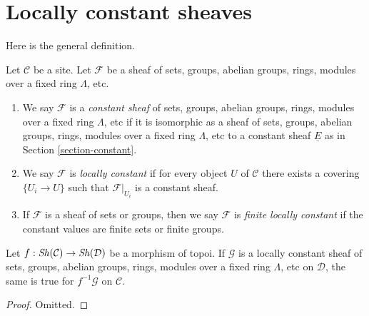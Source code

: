 \section{Locally constant sheaves}
\label{section-locally-constant}

\noindent
Here is the general definition.

\begin{definition}
\label{definition-locally-constant}
Let $\mathcal{C}$ be a site. Let $\mathcal{F}$ be a sheaf of sets, groups,
abelian groups, rings, modules over a fixed ring $\Lambda$, etc.
\begin{enumerate}
\item We say $\mathcal{F}$ is a
{\it constant sheaf} of
sets, groups, abelian groups, rings, modules over a fixed ring $\Lambda$, etc
if it is isomorphic as a sheaf of
sets, groups, abelian groups, rings, modules over a fixed ring $\Lambda$, etc
to a constant sheaf $\underline{E}$ as in Section \ref{section-constant}.
\item We say $\mathcal{F}$ is {\it locally constant} if for every object
$U$ of $\mathcal{C}$ there exists a
covering $\{U_i \to U\}$ such that $\mathcal{F}|_{U_i}$ is a constant sheaf.
\item If $\mathcal{F}$ is a sheaf of sets or groups, then we say $\mathcal{F}$
is {\it finite locally constant} if the constant values are finite sets or
finite groups.
\end{enumerate}
\end{definition}

\begin{lemma}
\label{lemma-pullback-locally-constant}
Let $f : \mathop{\mathit{Sh}}\nolimits(\mathcal{C}) \to \mathop{\mathit{Sh}}\nolimits(\mathcal{D})$ be a morphism of topoi.
If $\mathcal{G}$ is a locally constant sheaf of
sets, groups, abelian groups, rings, modules over a fixed ring $\Lambda$, etc
on $\mathcal{D}$, the same is true for $f^{-1}\mathcal{G}$
on $\mathcal{C}$.
\end{lemma}

\begin{proof}
Omitted.
\end{proof}

